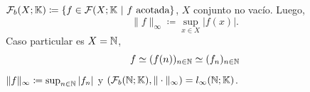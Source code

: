 \begin{eg}
	$\mathcal{F}_{b}(X; \mathbb{K}) \coloneq \{f \in \mathcal{F}(X; \mathbb{K} \ | \ f \text{ acotada}\}$, $X$ conjunto no vacío. Luego,
	\[ \| f \|_{\infty} \coloneq \sup_{x \in X} |f(x)|. \]
	Caso particular es $X = \mathbb{N}$,
	\[ f \simeq (f(n))_{n \in \mathbb{N}} \simeq (f_{n})_{n \in \mathbb{N}} \]
	$\| f \|_{\infty} \coloneq \sup_{n \in \mathbb{N}} |f_{n}|$ y $(\mathcal{F}_{b}(\mathbb{N}; \mathbb{K}), \| \cdot \|_{\infty}) = l_{\infty}(\mathbb{N} ; \mathbb{K})$.
\end{eg}
